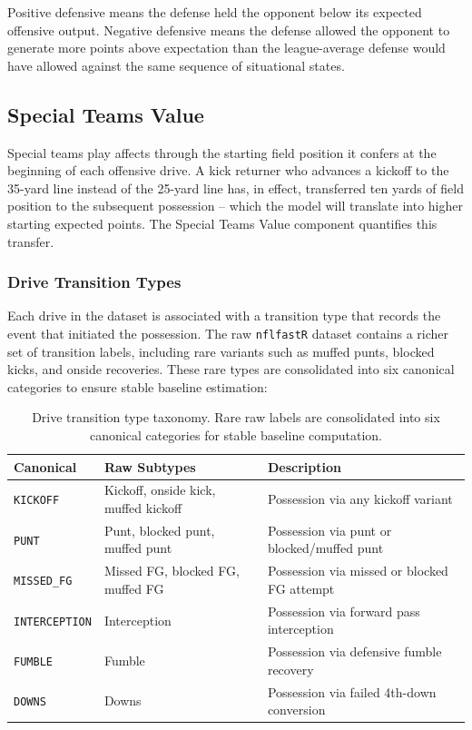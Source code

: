 Positive defensive \xvoa{} means the defense held the opponent below its
expected offensive output. Negative defensive \xvoa{} means the defense
allowed the opponent to generate more points above expectation than the
league-average defense would have allowed against the same sequence of
situational states.

\subsection{Special Teams Value}
\label{sec:st-value}

Special teams play affects \gds{} through the starting field position it
confers at the beginning of each offensive drive. A kick returner who advances
a kickoff to the 35-yard line instead of the 25-yard line has, in effect,
transferred ten yards of field position to the subsequent possession -- which
the \xscore{} model will translate into higher starting expected points.
The Special Teams Value component quantifies this transfer.

\subsubsection{Drive Transition Types}
\label{sec:drive-transitions}

Each drive in the dataset is associated with a transition type that records
the event that initiated the possession. The raw \texttt{nflfastR} dataset
contains a richer set of transition labels, including rare variants such as
muffed punts, blocked kicks, and onside recoveries. These rare types are
consolidated into six canonical categories to ensure stable baseline
estimation:

\begin{table}[htbp]
  \centering
  \caption{Drive transition type taxonomy. Rare raw labels are consolidated
           into six canonical categories for stable baseline computation.}
  \label{tab:transitions}
  \small
  \begin{tabularx}{\textwidth}{l l X}
    \toprule
    \textbf{Canonical} & \textbf{Raw Subtypes} & \textbf{Description} \\
    \midrule
    \texttt{KICKOFF}
      & Kickoff, onside kick, muffed kickoff
      & Possession via any kickoff variant \\[3pt]
    \texttt{PUNT}
      & Punt, blocked punt, muffed punt
      & Possession via punt or blocked/muffed punt \\[3pt]
    \texttt{MISSED\_FG}
      & Missed FG, blocked FG, muffed FG
      & Possession via missed or blocked FG attempt \\[3pt]
    \texttt{INTERCEPTION}
      & Interception
      & Possession via forward pass interception \\[3pt]
    \texttt{FUMBLE}
      & Fumble
      & Possession via defensive fumble recovery \\[3pt]
    \texttt{DOWNS}
      & Downs
      & Possession via failed 4th-down conversion \\
    \bottomrule
  \end{tabularx}
\end{table}

